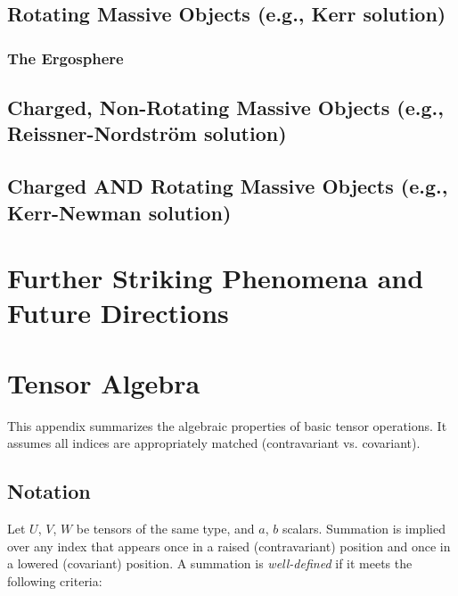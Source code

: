 \documentclass{amsart}
\theoremstyle{definition}
\theoremstyle{remark}
\begin{document}
\subsection{Rotating Massive Objects (e.g., Kerr solution)}
\subsubsection{The Ergosphere}

\subsection{Charged, Non-Rotating Massive Objects (e.g., Reissner-Nordström solution)}

\subsection{Charged AND Rotating Massive Objects (e.g., Kerr-Newman solution)}

\section{Further Striking Phenomena and Future Directions}
\label{sec:future_phenomena}

\appendix
\section{Tensor Algebra}
This appendix summarizes the algebraic properties of basic tensor operations. It assumes all indices are appropriately matched (contravariant vs. covariant).

\subsection*{Notation}
Let $U$, $V$, $W$ be tensors of the same type, and $a$, $b$ scalars. Summation is implied over any index that appears once in a raised (contravariant) position and once in a lowered (covariant) position. A summation is \emph{well-defined} if it meets the following criteria:
\end{document}
